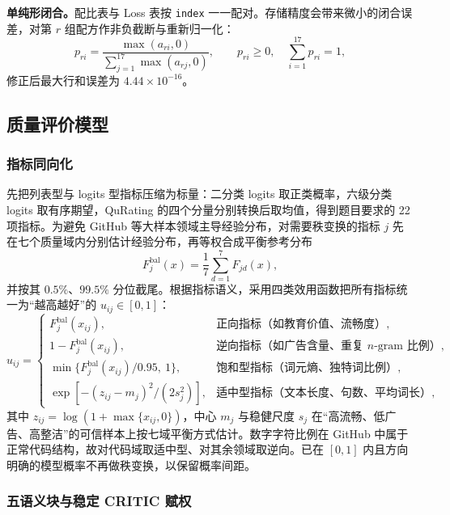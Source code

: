 \textbf{单纯形闭合。}配比表与 Loss 表按 \texttt{index} 一一配对。存储精度会带来微小的闭合误差，对第 $r$ 组配方作非负截断与重新归一化：
\begin{equation}
p_{ri}=\frac{\max(a_{ri},0)}{\sum_{j=1}^{17}\max(a_{rj},0)},\qquad p_{ri}\ge0,\quad \sum_{i=1}^{17}p_{ri}=1,
\label{eq:p1_closure}
\end{equation}
修正后最大行和误差为 $4.44\times10^{-16}$。

\subsection{质量评价模型}

\subsubsection{指标同向化}

先把列表型与 logits 型指标压缩为标量：二分类 logits 取正类概率，六级分类 logits 取有序期望，QuRating\cite{wettig2024qurating} 的四个分量分别转换后取均值，得到题目要求的 22 项指标。为避免 GitHub 等大样本领域主导经验分布，对需要秩变换的指标 $j$ 先在七个质量域内分别估计经验分布，再等权合成平衡参考分布
\begin{equation}
F_j^{\mathrm{bal}}(x)=\frac17\sum_{d=1}^{7}F_{jd}(x),
\label{eq:p1_bal}
\end{equation}
并按其 $0.5\%$、$99.5\%$ 分位截尾。根据指标语义，采用四类效用函数把所有指标统一为“越高越好”的 $u_{ij}\in[0,1]$：
\begin{equation}
u_{ij}=
\begin{cases}
F_j^{\mathrm{bal}}(x_{ij}), & \text{正向指标（如教育价值、流畅度）},\\[2pt]
1-F_j^{\mathrm{bal}}(x_{ij}), & \text{逆向指标（如广告含量、重复 $n$-gram 比例）},\\[2pt]
\min\{F_j^{\mathrm{bal}}(x_{ij})/0.95,\ 1\}, & \text{饱和型指标（词元熵、独特词比例）},\\[2pt]
\exp\!\left[-(z_{ij}-m_j)^2/(2s_j^2)\right], & \text{适中型指标（文本长度、句数、平均词长）},
\end{cases}
\label{eq:p1_utility}
\end{equation}
其中 $z_{ij}=\log(1+\max\{x_{ij},0\})$，中心 $m_j$ 与稳健尺度 $s_j$ 在“高流畅、低广告、高整洁”的可信样本上按七域平衡方式估计。数字字符比例在 GitHub 中属于正常代码结构，故对代码域取适中型、对其余领域取逆向。已在 $[0,1]$ 内且方向明确的模型概率不再做秩变换，以保留概率间距。

\subsubsection{五语义块与稳定 CRITIC 赋权}


